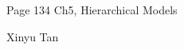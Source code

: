 \documentclass{article}
\begin{document}
\large %


{\Large Page 134 %
\hfill  Ch5, Hierarchical Models}

\begin{center}
{\Large Xinyu Tan} 
\end{center}
\vspace{0.05in}

 \renewcommand{\labelitemi}{$\textendash$}
\end{document}
